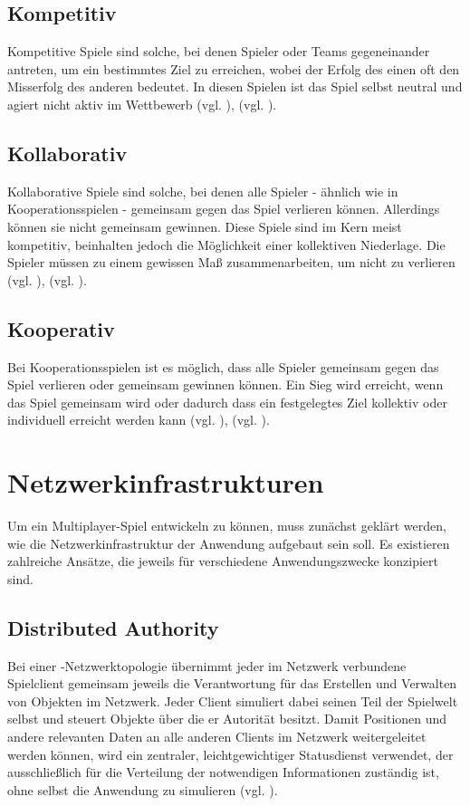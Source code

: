 \subsection{Kompetitiv}
Kompetitive Spiele sind solche, bei denen Spieler oder Teams gegeneinander antreten, um ein bestimmtes Ziel zu erreichen, wobei der Erfolg des einen oft den Misserfolg des anderen bedeutet. In diesen Spielen ist das Spiel selbst neutral und agiert nicht aktiv im Wettbewerb (vgl. \cite{noauthor_game_2014}), (vgl. \cite[S. 25]{zagal_collaborative_2006}).

\subsection{Kollaborativ}
Kollaborative Spiele sind solche, bei denen alle Spieler - ähnlich wie in Kooperationsspielen - gemeinsam gegen das Spiel verlieren können. Allerdings können sie nicht gemeinsam gewinnen. Diese Spiele sind im Kern meist kompetitiv, beinhalten jedoch die Möglichkeit einer kollektiven Niederlage. Die Spieler müssen zu einem gewissen Maß zusammenarbeiten, um nicht zu verlieren (vgl. \cite{noauthor_game_2014}), (vgl. \cite[S. 25]{zagal_collaborative_2006}).

\subsection{Kooperativ}
Bei Kooperationsspielen ist es möglich, dass alle Spieler gemeinsam gegen das Spiel verlieren oder gemeinsam gewinnen können. Ein Sieg wird erreicht, wenn das Spiel gemeinsam  wird oder dadurch dass ein festgelegtes Ziel kollektiv oder individuell erreicht werden kann (vgl. \cite{noauthor_game_2014}), (vgl. \cite[S. 25]{zagal_collaborative_2006}).


\section{Netzwerkinfrastrukturen}\label{sec:basics-network-structures}
Um ein Multiplayer-Spiel entwickeln zu können, muss zunächst geklärt werden, wie die Netzwerkinfrastruktur der Anwendung aufgebaut sein soll. Es existieren zahlreiche Ansätze, die jeweils für verschiedene Anwendungszwecke konzipiert sind.

\subsection{Distributed Authority}
Bei einer -Netzwerktopologie übernimmt jeder im Netzwerk verbundene Spielclient gemeinsam jeweils die Verantwortung für das Erstellen und Verwalten von Objekten im Netzwerk. Jeder Client simuliert dabei seinen Teil der Spielwelt selbst und steuert Objekte über die er Autorität besitzt.
Damit Positionen und andere relevanten Daten an alle anderen Clients im Netzwerk weitergeleitet werden können, wird ein zentraler, leichtgewichtiger Statusdienst verwendet, der ausschließlich für die Verteilung der notwendigen Informationen zuständig ist, ohne selbst die Anwendung zu simulieren (vgl. \cite{noauthor_distributed_2025}).

